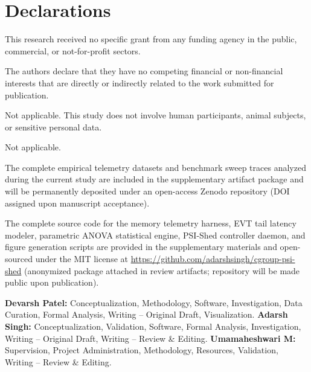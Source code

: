 \documentclass[pdflatex,sn-mathphys,Numbered]{sn-jnl}
\begin{document}
\section*{Declarations}

This research received no specific grant from any funding agency in the public, commercial, or not-for-profit sectors.

The authors declare that they have no competing financial or non-financial interests that are directly or indirectly related to the work submitted for publication.

Not applicable. This study does not involve human participants, animal subjects, or sensitive personal data.

Not applicable.

The complete empirical telemetry datasets and benchmark sweep traces analyzed during the current study are included in the supplementary artifact package and will be permanently deposited under an open-access Zenodo repository (DOI assigned upon manuscript acceptance).

The complete source code for the memory telemetry harness, EVT tail latency modeler, parametric ANOVA statistical engine, PSI-Shed controller daemon, and figure generation scripts are provided in the supplementary materials and open-sourced under the MIT license at \url{https://github.com/adarshsingh/cgroup-psi-shed} (anonymized package attached in review artifacts; repository will be made public upon publication).

\textbf{Devarsh Patel:} Conceptualization, Methodology, Software, Investigation, Data Curation, Formal Analysis, Writing -- Original Draft, Visualization.
\textbf{Adarsh Singh:} Conceptualization, Validation, Software, Formal Analysis, Investigation, Writing -- Original Draft, Writing -- Review \& Editing.
\textbf{Umamaheshwari M:} Supervision, Project Administration, Methodology, Resources, Validation, Writing -- Review \& Editing.


\end{document}
